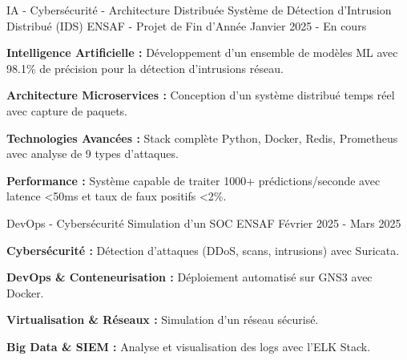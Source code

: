 
\begin{cventries}


  \cventry
  {IA - Cybersécurité - Architecture Distribuée}
  {Système de Détection d'Intrusion Distribué (IDS)} %
  {ENSAF - Projet de Fin d'Année} %
  {Janvier 2025 - En cours} %
  {
    \begin{cvitems} %
      \item {
                  \textbf{Intelligence Artificielle :}
                  Développement d'un ensemble de modèles ML avec 98.1\% de précision pour la détection d'intrusions réseau.}
      \item {
                  \textbf{Architecture Microservices :}
                  Conception d'un système distribué temps réel avec capture de paquets.}
      \item {
                  \textbf{Technologies Avancées :}
                  Stack complète Python, Docker, Redis, Prometheus avec analyse de 9 types d'attaques.}
      \item {
                  \textbf{Performance :}
                  Système capable de traiter 1000+ prédictions/seconde avec latence <50ms et taux de faux positifs <2\%.}
    \end{cvitems}
  }


  \cventry
  {DevOps - Cybersécurité}
  {Simulation d’un SOC} %
  {ENSAF} %
  {Février 2025 - Mars 2025} %
  {
    \begin{cvitems} %
      \item {
                  \textbf{Cybersécurité :}
                  Détection d’attaques (DDoS, scans, intrusions) avec Suricata.}
      \item {
                  \textbf{DevOps \& Conteneurisation :}
                  Déploiement automatisé sur GNS3 avec Docker.}
      \item {
                  \textbf{Virtualisation \& Réseaux :}
                  Simulation d’un réseau sécurisé.}
      \item {
                  \textbf{Big Data \& SIEM :}
                  Analyse et visualisation des logs avec l’ELK Stack.}
    \end{cvitems}
  }

\end{cventries}
